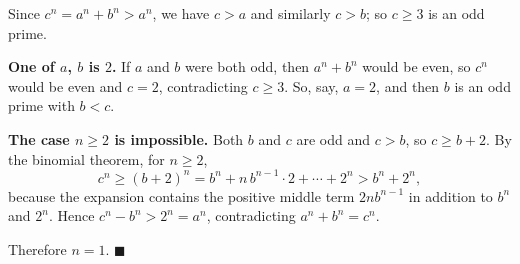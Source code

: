 Since $c^n=a^n+b^n>a^n$, we have $c>a$ and similarly $c>b$; so $c\ge3$ is an odd prime.

\textbf{One of $a$, $b$ is $2$.} If $a$ and $b$ were both odd, then $a^n+b^n$ would be even, so $c^n$ would be even and $c=2$, contradicting $c\ge3$. So, say, $a=2$, and then $b$ is an odd prime with $b<c$.

\textbf{The case $n\ge2$ is impossible.} Both $b$ and $c$ are odd and $c>b$, so $c\ge b+2$. By the binomial theorem, for $n\ge2$,
\[
c^n\ge(b+2)^n=b^n+n\,b^{n-1}\cdot2+\cdots+2^n>b^n+2^n ,
\]
because the expansion contains the positive middle term $2nb^{n-1}$ in addition to $b^n$ and $2^n$. Hence $c^n-b^n>2^n=a^n$, contradicting $a^n+b^n=c^n$.

Therefore $n=1$. $\blacksquare$
